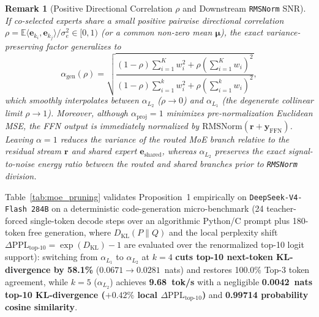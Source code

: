 \documentclass[10pt,twocolumn]{article}
\newtheorem{remark}{Remark}
\begin{document}
\begin{remark}[Positive Directional Correlation $\rho$ and Downstream \texttt{RMSNorm} SNR]
If co-selected experts share a small positive pairwise directional correlation $\rho = \mathbb{E}\langle \mathbf{e}_{k_i}, \mathbf{e}_{k_j}\rangle / \sigma_e^2 \in [0, 1)$ (or a common non-zero mean $\boldsymbol{\mu}$), the exact variance-preserving factor generalizes to
\[
\alpha_{\text{gen}}(\rho) = \sqrt{\frac{(1-\rho)\sum_{i=1}^K w_i^2 + \rho\left(\sum_{i=1}^K w_i\right)^2}{(1-\rho)\sum_{i=1}^k w_i^2 + \rho\left(\sum_{i=1}^k w_i\right)^2}},
\]
which smoothly interpolates between $\alpha_{L_2}$ ($\rho \to 0$) and $\alpha_{L_1}$ (the degenerate collinear limit $\rho \to 1$). Moreover, although $\alpha_{\text{proj}}=1$ minimizes pre-normalization Euclidean MSE, the FFN output is immediately normalized by $\text{RMSNorm}(\mathbf{r} + \mathbf{y}_{\text{FFN}})$. Leaving $\alpha=1$ reduces the variance of the routed MoE branch relative to the residual stream $\mathbf{r}$ and shared expert $\mathbf{e}_{\text{shared}}$, whereas $\alpha_{L_2}$ preserves the exact signal-to-noise energy ratio between the routed and shared branches prior to \texttt{RMSNorm} division.
\end{remark}

Table~\ref{tab:moe_pruning} validates Proposition~1 empirically on \texttt{DeepSeek-V4-Flash 284B} on a deterministic code-generation micro-benchmark (24 teacher-forced single-token decode steps over an algorithmic Python/C prompt plus 180-token free generation, where $D_{\text{KL}}(P \| Q)$ and the local perplexity shift $\Delta\text{PPL}_{\text{top-10}} = \exp(D_{\text{KL}}) - 1$ are evaluated over the renormalized top-10 logit support): switching from $\alpha_{L_1}$ to $\alpha_{L_2}$ at $k=4$ \textbf{cuts top-10 next-token KL-divergence by 58.1\%} ($0.0671 \to 0.0281$~nats) and restores 100.0\% Top-3 token agreement, while $k=5$ ($\alpha_{L_2}$) achieves \textbf{9.68~tok/s} with a negligible \textbf{0.0042~nats top-10 KL-divergence ($+0.42\%$ local $\Delta\text{PPL}_{\text{top-10}}$)} and \textbf{0.99714 probability cosine similarity}.
\end{document}
